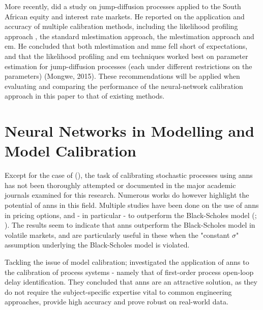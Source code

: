 \documentclass[11pt,oneside,openany,a4paper,english, report, goldenblock
]{usthesis}
\begin{document}
More recently, \citet{Mongwe} did a study on jump-diffusion processes applied to the South African equity and interest rate markets. He reported on the application and accuracy of multiple calibration methods, including the likelihood profiling approach \citep{Honore}, the standard \acrshort{mlestimation} approach, the \acrshort{mlestimation} approach and \acrfull{em}. He concluded that both \acrshort{mlestimation} and \acrshort{mme} fell short of expectations, and that the likelihood profiling and \acrshort{em} techniques worked best on parameter estimation for jump-diffusion processes (each under different restrictions on the parameters) (Mongwe, 2015). These recommendations will be applied when evaluating and comparing the performance of the neural-network calibration approach in this paper to that of existing methods.


\section{Neural Networks in Modelling and Model Calibration}
Except for the case of  (\citeyear{Xie}), the task of calibrating stochastic processes using \acrshort{ann}s has not been thoroughly attempted or documented in the major academic journals examined for this research. Numerous works do however highlight the potential of \acrshort{ann}s in this field.
Multiple studies have been done on the use of \acrshort{ann}s in pricing options, and - in particular - to outperform the Black-Scholes model (; \citeyear{Yao}). The results seem to indicate that \acrshort{ann}s outperform the Black-Scholes model in volatile markets, and are particularly useful in these when the "constant $\sigma$" assumption underlying the Black-Scholes model is violated.


Tackling the issue of model calibration; \citet{Samad} investigated the application of \acrshort{ann}s to the calibration of process systems - namely that of first-order process open-loop delay identification. They concluded that \acrshort{ann}s are an attractive solution, as they do not require the subject-specific expertise vital to common engineering approaches, provide high accuracy and prove robust on real-world data.
\end{document}
